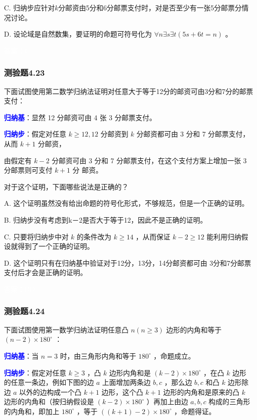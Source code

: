 \documentclass[UTF8, heading=true]{ctexart}
\begin{document}
C. 归纳步应针对$k$分邮资由5分和6分邮票支付时，对是否至少有一张5分邮票分情况讨论。

D.  设论域是自然数集，要证明的命题可符号化为 $\forall n \exists s \exists t(5 s+6 t=n)$ 。

\textcolor{white}{答案：C}

\subsubsection{测验题4.23}

下面试图使用第二数学归纳法证明对任意大于等于12分的邮资可由3分和7分的邮票支付：

\textcolor{blue}{\textbf{归纳基}}：显然 12 分邮资可由 4 张 3 分邮票支付。

\textcolor{blue}{\textbf{归纳步}}：假定对任意 $k \geq 12,12$ 分邮资到 $k$ 分邮资都可由 3 分和 7 分邮票支付，从而 $k+1$ 分邮资，

由假定有 $k-2$ 分邮资可由 3 分和 7 分邮票支付，在这个支付方案上增加一张 3 分邮票则可支付 $k+1$ 分
邮资。

对于这个证明，下面哪些说法是正确的？

A. 
这个证明虽然没有给出命题的符号化形式，不够规范，但是一个正确的证明。

B. 
归纳步没有考虑到k－2是否大于等于12，因此不是正确的证明。

C. 
只要将归纳步中对 $k$ 的条件改为 $k \geq 14$ ，从而保证 $k-2 \geq 12$ 能利用归纳假设就得到了一个正确的证明。

D.  
这个证明只有在归纳基中验证对于12分，13分，14分邮资都可由 3分和7分邮票支付后才会是正确的证明。


\textcolor{white}{答案：BD}

\subsubsection{测验题4.24}

下面试图使用第一数学归纳法证明任意凸 $n(n \geq 3)$ 边形的内角和等于 $(n-2) \times 180^{\circ}$ ：

\textcolor{blue}{\textbf{归纳基}}：当 $n=3$ 时，由三角形内角和等于 $180^{\circ}$ ，命题成立。

\textcolor{blue}{\textbf{归纳步}}：假定对任意 $k \geq 3$ ，凸 $k$ 边形内角和是 $(k-2) \times 180^{\circ}$ ，在凸 $k$ 边形的任意一条边，例如下图的边 $a$ 上面增加两条边 $b, c$ ，那么边 $b, c$ 和凸 $k$ 边形除边 $a$ 以外的边构成一个凸 $k+1$ 边形，这个凸 $k+1$ 边形的内角和是原来的凸 $k$ 边形的内角和（按归纳假设是 $(k-2) \times 180^{\circ}$ ）再加上由边 $a, b, c$ 构成的三角形的内角和，即加上 $180^{\circ}$ ，等于 $((k+1)-2) \times 180^{\circ}$ ，命题得证。
\end{document}
